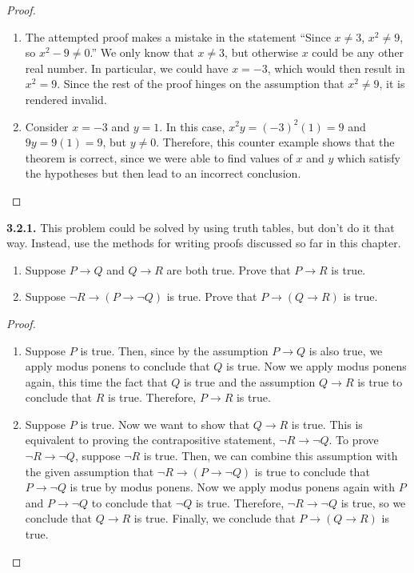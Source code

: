 \documentclass[12pt]{amsart}
\newenvironment{statement}[1]{\smallskip\noindent\color[rgb]{.6627, .3529, .6314} {\bf #1.}}{}
\theoremstyle{definition}
\theoremstyle{remark}
\begin{document}
\begin{proof}
\hfill
\begin{enumerate}
	\item The attempted proof makes a mistake in the statement
	``Since $x \neq 3$, $x^2 \neq 9$, so $x^2 - 9 \neq 0$.''
	We only know that $x \neq 3$, but otherwise $x$ could be any other real number.
	In particular, we could have $x = -3$, which would then result in $x^2 = 9$.
	Since the rest of the proof hinges on the assumption that $x^2 \neq 9$, it is rendered invalid.
	
	\item Consider $x = -3$ and $y = 1$.
	In this case, $x^2y = (-3)^2(1) = 9$ and $9y = 9(1) = 9$, but $y \neq 0$.
	Therefore, this counter example shows that the theorem is correct,
	since we were able to find values of $x$ and $y$ which satisfy the hypotheses but
	then lead to an incorrect conclusion.
\end{enumerate}
\end{proof}


\begin{statement}{3.2.1}
This problem could be solved by using truth tables, but don't do it that way.
Instead, use the methods for writing proofs discussed so far in this chapter.
\begin{enumerate}
	\item Suppose $P \rightarrow Q$ and $Q \rightarrow R$ are both true.
	Prove that $P \rightarrow R$ is true.
	
	\item Suppose $\neg R \rightarrow (P \rightarrow \neg Q)$ is true.
	Prove that $P \rightarrow (Q \rightarrow R)$ is true.
\end{enumerate}
\end{statement}

\begin{proof}
\hfill
\begin{enumerate}
	\item Suppose $P$ is true.
	Then, since by the assumption $P \rightarrow Q$ is also true, we apply modus ponens
	to conclude that $Q$ is true.
	Now we apply modus ponens again, this time the fact that $Q$ is true and the assumption
	$Q \rightarrow R$ is true to conclude that $R$ is true.
	Therefore, $P \rightarrow R$ is true.
	
	\item Suppose $P$ is true.
	Now we want to show that $Q \rightarrow R$ is true.
	This is equivalent to proving the contrapositive statement, $\neg R \rightarrow \neg Q$.
	To prove $\neg R \rightarrow \neg Q$, suppose $\neg R$ is true.
	Then, we can combine this assumption with the given assumption that
	$\neg R \rightarrow (P \rightarrow \neg Q)$ is true to conclude that
	$P \rightarrow \neg Q$ is true by modus ponens.
	Now we apply modus ponens again with $P$ and $P \rightarrow \neg Q$ to conclude
	that $\neg Q$ is true.
	Therefore, $\neg R \rightarrow \neg Q$ is true, so we conclude that $Q \rightarrow R$ is true.
	Finally, we conclude that $P \rightarrow (Q \rightarrow R)$ is true.
\end{enumerate}
\end{proof}
\end{document}
